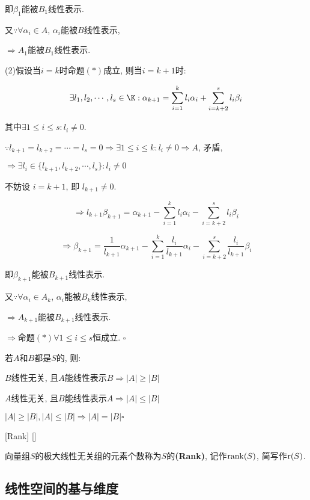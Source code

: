 \documentclass[UTF8]{ctexart}
\begin{document}
\begin{prf}
			即$\beta_{1}$能被$B_{1}$线性表示. 
			
			又$\because \forall \alpha_{i}\in A$, $\alpha_{i}$能被$B$线性表示, 
			
			$\Longrightarrow A_{1}$能被$B_{1}$线性表示. 
			
			(2)假设当$i=k$时命题$(*)$成立, 则当$i=k+1$时: 
			
			$$\exists l_{1},l_{2},\cdots, l_{s}\in \K: \alpha_{k+1}=\sum_{i=1}^{k}l_{i}\alpha_{i}+\sum_{i=k+2}^{s}l_{i}\beta_{i}$$
			
			其中$\exists1\leq i\leq s: l_{i}\neq 0$. 
			
			$\because l_{k+1}=l_{k+2}=\cdots=l_{s}=0\Longrightarrow \exists 1\leq i\leq k: l_{i}\neq 0 \Longrightarrow A$, 矛盾, 
			
			$\Longrightarrow\exists l_{i}\in \{l_{k+1},l_{k+2},\cdots, l_{s}\} :l_{i}\neq 0$
			
			不妨设 $i=k+1$, 即 $l_{k+1}\neq 0$. 
			
			$$\Longrightarrow l_{k+1}\beta_{k+1}=\alpha_{k+1}-\sum_{i=1}^{k}l_{i}\alpha_{i}-\sum_{i=k+2}^{s}l_{i}\beta_{i}$$
			
			$$\Longrightarrow \beta_{k+1}=\frac{1}{l_{k+1}}\alpha_{k+1}-\sum_{i=1}^{k}\frac{l_i}{l_{k+1}}\alpha_{i}-\sum_{i=k+2}^{s}\frac{l_i}{l_{k+1}}\beta_{i}$$
			
			即$\beta_{k+1}$能被$B_{k+1}$线性表示. 
			
			又$\because \forall \alpha_{i}\in A_{k}$, $\alpha_{i}$能被$B_{k}$线性表示, 
			
			$\Longrightarrow A_{k+1}$能被$B_{k+1}$线性表示. 
			
			$\Longrightarrow$命题$(*)\forall 1\leq i\leq s$恒成立. $\square$
			
			若$A$和$B$都是$S$的, 则: 
			
			$B$线性无关, 且$A$能线性表示$B \Longrightarrow |A|\geq |B|$
			
			$A$线性无关, 且$B$能线性表示$A \Longrightarrow |A|\leq |B|$
			
			$|A|\geq |B|,|A|\leq |B|\Longrightarrow |A|=|B|\square$
        \end{prf}
			
		\begin{dfn}
			[Rank]
			{\秩}
			[Rank]
			[]

			向量组$S$的极大线性无关组的元素个数称为$S$的\textbf{\秩(Rank)}, 记作${\rm rank}(S)$, 简写作${\rm r}(S)$. 
		\end{dfn}
	
	\subsection{线性空间的基与维度}
		
\end{document}
